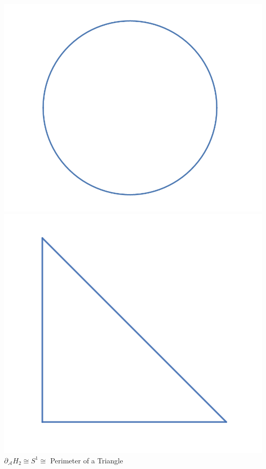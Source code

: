 \documentclass[12pt]{article}
\newcommand{\cA}{{\mathcal A}}
\theoremstyle{definition}
\begin{document}
\begin{enumerate}
\begin{center}
                  \includegraphics[scale = 0.4]{D_H_0.png}\includegraphics[scale=0.4]{perimeter.png}\\
                  $\partial_\cA H_2 \cong S^1 \cong$ Perimeter of a Triangle
            
            \end{center}
\end{enumerate}
\end{document}
